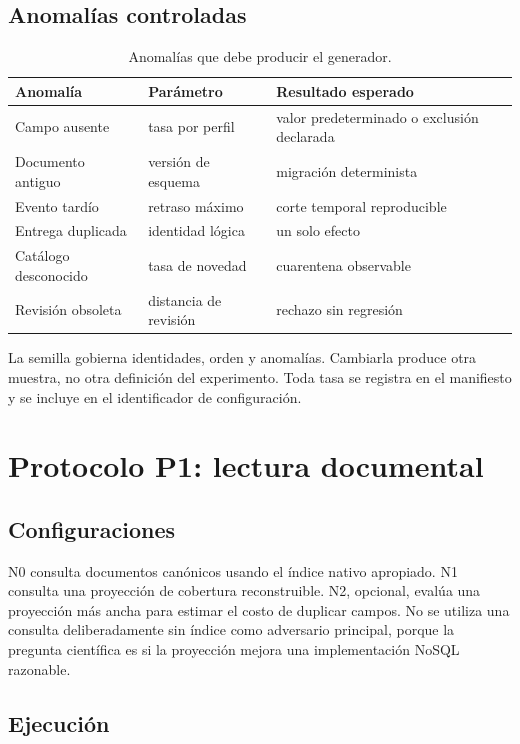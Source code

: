 \section{Anomalías controladas}

\begin{table}[H]\centering
\caption{Anomalías que debe producir el generador.}
\begin{tabularx}{\textwidth}{p{3.4cm}p{3cm}X}\toprule
Anomalía & Parámetro & Resultado esperado\\\midrule
Campo ausente & tasa por perfil & valor predeterminado o exclusión declarada\\
Documento antiguo & versión de esquema & migración determinista\\
Evento tardío & retraso máximo & corte temporal reproducible\\
Entrega duplicada & identidad lógica & un solo efecto\\
Catálogo desconocido & tasa de novedad & cuarentena observable\\
Revisión obsoleta & distancia de revisión & rechazo sin regresión\\
\bottomrule\end{tabularx}\end{table}

La semilla gobierna identidades, orden y anomalías. Cambiarla produce otra muestra, no
otra definición del experimento. Toda tasa se registra en el manifiesto y se incluye en
el identificador de configuración.

\chapter{Protocolo P1: lectura documental}

\section{Configuraciones}

N0 consulta documentos canónicos usando el índice nativo apropiado. N1 consulta una
proyección de cobertura reconstruible. N2, opcional, evalúa una proyección más ancha para
estimar el costo de duplicar campos. No se utiliza una consulta deliberadamente sin
índice como adversario principal, porque la pregunta científica es si la proyección
mejora una implementación NoSQL razonable.

\section{Ejecución}


